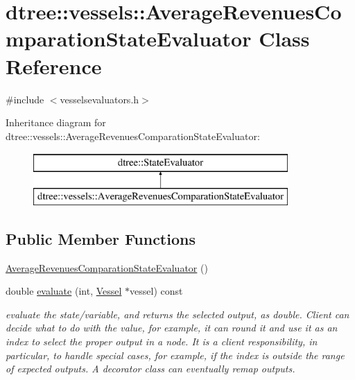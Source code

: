 \hypertarget{classdtree_1_1vessels_1_1_average_revenues_comparation_state_evaluator}{}\section{dtree\+::vessels\+::Average\+Revenues\+Comparation\+State\+Evaluator Class Reference}
\label{classdtree_1_1vessels_1_1_average_revenues_comparation_state_evaluator}


{\ttfamily \#include $<$vesselsevaluators.\+h$>$}

Inheritance diagram for dtree\+::vessels\+::Average\+Revenues\+Comparation\+State\+Evaluator\+:\begin{figure}[H]
\begin{center}
\leavevmode
\includegraphics[height=2.000000cm]{d6/de7/classdtree_1_1vessels_1_1_average_revenues_comparation_state_evaluator}
\end{center}
\end{figure}
\subsection*{Public Member Functions}
\begin{DoxyCompactItemize}
\item 
\mbox{\hyperlink{classdtree_1_1vessels_1_1_average_revenues_comparation_state_evaluator_a38e913cb1ecddbb95c05743f9c82ef5f}{Average\+Revenues\+Comparation\+State\+Evaluator}} ()
\item 
double \mbox{\hyperlink{classdtree_1_1vessels_1_1_average_revenues_comparation_state_evaluator_a6c1e969c3e60c9a30858cc20378c0b48}{evaluate}} (int, \mbox{\hyperlink{class_vessel}{Vessel}} $\ast$vessel) const
\begin{DoxyCompactList}\small\item\em evaluate the state/variable, and returns the selected output, as double. Client can decide what to do with the value, for example, it can round it and use it as an index to select the proper output in a node. It is a client responsibility, in particular, to handle special cases, for example, if the index is outside the range of expected outputs. A decorator class can eventually remap outputs. \end{DoxyCompactList}\end{DoxyCompactItemize}


